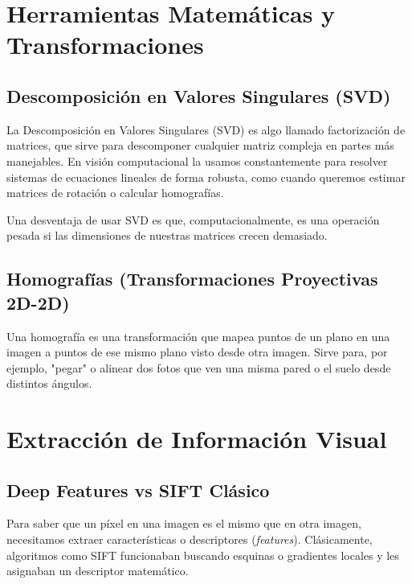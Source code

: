 
\section{Herramientas Matemáticas y Transformaciones}

\subsection{Descomposición en Valores Singulares (SVD)}
La Descomposición en Valores Singulares (SVD) es algo llamado factorización de matrices, que sirve para descomponer cualquier matriz compleja en partes más manejables. En visión computacional la usamos constantemente para resolver sistemas de ecuaciones lineales de forma robusta, como cuando queremos estimar matrices de rotación o calcular homografías.

Una desventaja de usar SVD es que, computacionalmente, es una operación pesada si las dimensiones de nuestras matrices crecen demasiado.


\subsection{Homografías (Transformaciones Proyectivas 2D-2D)}
Una homografía es una transformación que mapea puntos de un plano en una imagen a puntos de ese mismo plano visto desde otra imagen. Sirve para, por ejemplo, "pegar" o alinear dos fotos que ven una misma pared o el suelo desde distintos ángulos.


\section{Extracción de Información Visual}

\subsection{Deep Features vs SIFT Clásico}
Para saber que un píxel en una imagen es el mismo que en otra imagen, necesitamos extraer características o descriptores (\textit{features}). Clásicamente, algoritmos como SIFT funcionaban buscando esquinas o gradientes locales y les asignaban un descriptor matemático.

